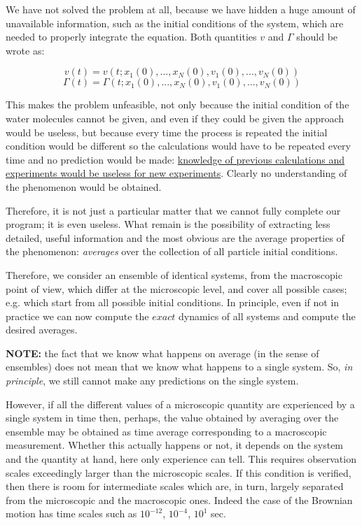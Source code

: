 \documentclass{article}
\begin{document}
We have not solved the problem at all, because we have hidden a huge amount of unavailable information, such as the initial conditions of the system, which are needed to properly integrate the equation. Both quantities $v$ and $\Gamma$ should be wrote as: 

$$v(t) = v(t;x_1(0),...,x_N(0),v_1(0),...,v_N(0) )$$ 
$$\Gamma(t) = \Gamma (t;x_1(0),...,x_N(0),v_1(0),...,v_N(0) )$$

This makes the problem unfeasible, not only because the initial condition of the water molecules cannot be given, and even if they could be given the approach would be useless, but because every time the process is repeated the initial condition would be different so the calculations would have to be repeated every time and no prediction would be made: \underline{knowledge of previous calculations and experiments would be useless for new experiments}. Clearly no understanding of the phenomenon would be obtained.

Therefore, it is not just a particular matter that we cannot fully complete our program; it is even useless. What remain is the possibility of extracting less detailed, useful information and the most obvious are the average properties of the phenomenon: \textit{averages} over the collection of all particle initial conditions.

Therefore, we consider an ensemble of identical systems, from the macroscopic point of view, which differ at the microscopic level, and cover all possible cases; e.g. which start from all possible initial conditions. In principle, even if not in practice we can now compute the $exact$ dynamics of all systems and compute the desired averages.
\newline

\textbf{NOTE:} the fact that we know what happens on average (in the sense of ensembles) does not mean that we know what happens to a single system. So, \textit{in principle}, we still cannot make any predictions on the single system. \newline
\newline

However, if all the different values of a microscopic quantity are experienced by a single system in time then, perhaps, the value obtained by averaging over the ensemble may be obtained as time average corresponding to a macroscopic measurement. Whether this actually happens or not, it depends on the system and the quantity at hand, here only experience can tell. This requires observation scales exceedingly larger than the microscopic scales. If this condition is verified, then there is room for intermediate scales which are, in turn, largely separated from the microscopic and the macroscopic ones. Indeed the case of the Brownian motion has time scales such as $10^{-12}$, $10^{-4}$, $10^{1}$ sec. 
\end{document}
